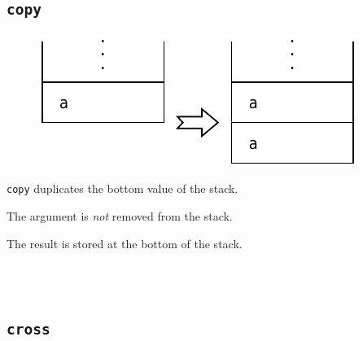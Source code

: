	
	\subsection*{\texttt{copy}}
	
		\begin{figure}
			\begin{flushright}
				\includegraphics[width=\linewidth]{figure/pdf/i_copy} 
			\end{flushright}
		\end{figure}
	
			\texttt{copy} duplicates the bottom value of the stack.
			
			The argument is \emph{not} removed from the stack.
			
			The result is stored at the bottom of the stack. \\\\\\
	
\newpage
\section*{}
	
	\subsection*{\texttt{cross}}
	
